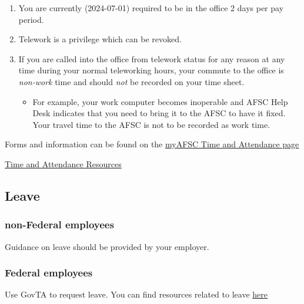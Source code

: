 \documentclass[
  letterpaper,
  DIV=11,
  numbers=noendperiod]{scrreprt}
\providecommand{\tightlist}{%
  \setlength{\itemsep}{0pt}\setlength{\parskip}{0pt}}\usepackage{longtable,booktabs,array}
\begin{document}
\begin{enumerate}
\def\labelenumi{\arabic{enumi}.}
\tightlist
\item
  You are currently (2024-07-01) required to be in the office 2 days per
  pay period.\\
\item
  Telework is a privilege which can be revoked.\\
\item
  If you are called into the office from telework status for any reason
  at any time during your normal teleworking hours, your commute to the
  office is \emph{non-work} time and should \emph{not} be recorded on
  your time sheet.

  \begin{itemize}
  \tightlist
  \item
    For example, your work computer becomes inoperable and AFSC Help
    Desk indicates that you need to bring it to the AFSC to have it
    fixed. Your travel time to the AFSC is not to be recorded as work
    time.
  \end{itemize}
\end{enumerate}

Forms and information can be found on the
\href{https://sites.google.com/noaa.gov/myafsc/administrative/time-and-attendance}{myAFSC
Time and Attendance page}

\href{https://sites.google.com/noaa.gov/myafsc/administrative/time-and-attendance}{Time
and Attendance Resources}

\subsection{Leave}\label{leave}

\subsubsection{non-Federal employees}\label{non-federal-employees-1}

Guidance on leave should be provided by your employer.

\subsubsection{Federal employees}\label{federal-employees-1}

Use GovTA to request leave. You can find resources related to leave
\href{https://sites.google.com/noaa.gov/myafsc/administrative/time-and-attendance}{here}
\end{document}
